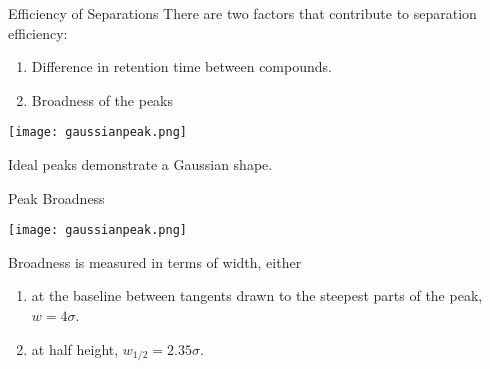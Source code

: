 \documentclass[notes=only]{beamer}
\begin{document}

\begin{frame}{Efficiency of Separations}
	There are two factors that contribute to separation efficiency:
	\begin{enumerate}
		\item Difference in retention time between compounds.
		\item Broadness of the peaks
	\end{enumerate}

	\begin{center}
		\texttt{[image: gaussianpeak.png]}
	\end{center}

	Ideal peaks demonstrate a Gaussian shape.
\end{frame}

\begin{frame}{Peak Broadness}
	\begin{center}
		\texttt{[image: gaussianpeak.png]}
	\end{center}

	Broadness is measured in terms of width, either
		\begin{enumerate}
			\item at the \alert{baseline} between tangents drawn to
				the steepest parts of the peak, $w = 4\sigma$.
			\item at \alert{half height}, $w_{1/2} = 2.35\sigma$.
				\visible<3>{\textbf{Why?}}
		\end{enumerate}

\end{frame}
\end{document}
